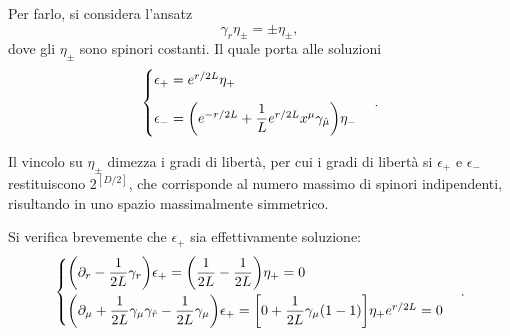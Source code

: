 Per farlo, si considera l'ansatz 
\begin{equation}
    \gamma_r\eta_\pm = \pm\eta_\pm,
\end{equation}
dove gli $\eta_\pm$ sono spinori costanti. Il quale porta alle soluzioni
\begin{equation}
    \begin{cases}
        \epsilon_+ = e^{r/2L}\eta_+ \\[2ex]
        \epsilon_- = \bigg(e^{-r/2L} + \dfrac{1}{L}e^{r/2L}x^\mu\gamma_{\hat{\mu}}\bigg)\eta_-
    \end{cases}.
\end{equation} 
\begin{obs}
    Il vincolo su $\eta_\pm$ dimezza i gradi di libertà, per cui i gradi di libertà si $\epsilon_+$ e $\epsilon_-$ restituiscono $2^{[D/2]}$, che corrisponde al numero massimo di spinori indipendenti, risultando in uno spazio massimalmente simmetrico.
\end{obs}
\begin{obs}
    Si verifica brevemente che $\epsilon_+$ sia effettivamente soluzione:
    \begin{equation}
    \begin{cases}
        \bigg(\partial_r - \dfrac{1}{2L}\gamma_r\bigg)\epsilon_+ = \bigg(\dfrac{1}{2L} - \dfrac{1}{2L}\bigg)\eta_+ = 0 \\[2ex] 
        \bigg(\partial_\mu + \dfrac{1}{2L}\gamma_\mu\gamma_{\hat{r}} - \dfrac{1}{2L}\gamma_\mu\bigg)\epsilon_+ = \bigg[0 + \dfrac{1}{2L}\gamma_\mu(1 - 1)\bigg]\eta_+e^{r/2L} = 0
    \end{cases}.
\end{equation}
\end{obs}

